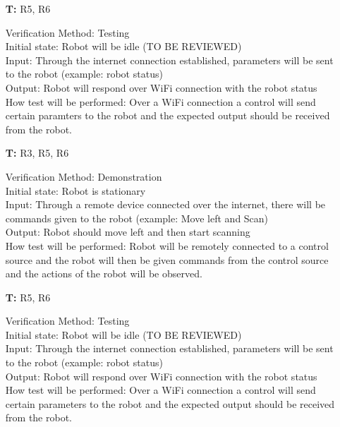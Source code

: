 \documentclass[12pt, titlepage]{article}
\newcounter{tnum} %
\begin{document}
\begin{itemize}
\item[\textbf{T\refstepcounter{tnum}\thetnum:}]{R5, R6\\}

Verification Method: Testing	\\
Initial state: Robot will be idle (TO BE REVIEWED) \\
Input: Through the internet connection established, parameters will be sent to the robot (example: robot status) \\
Output: Robot will respond over WiFi connection with the robot status  \\
How test will be performed: Over a WiFi connection a control will send certain paramters to the robot and the expected output should be received from the robot. \\

\item[\textbf{T\refstepcounter{tnum}\thetnum:}]{R3, R5, R6\\}

Verification Method: Demonstration\\
Initial state: Robot is stationary \\
Input: Through a remote device connected over the internet, there will be commands given to the robot (example: Move left and Scan) \\
Output: Robot should move left and then start scanning  \\
How test will be performed: Robot will be remotely connected to a control source and the robot will then be given commands from the control source and the actions of the robot will be observed. \\

\item[\textbf{T\refstepcounter{tnum}\thetnum:}]{R5, R6\\}

Verification Method: Testing\\
Initial state: Robot will be idle (TO BE REVIEWED) \\
Input: Through the internet connection established, parameters will be sent to the robot (example: robot status) \\
Output: Robot will respond over WiFi connection with the robot status  \\
How test will be performed: Over a WiFi connection a control will send certain parameters to the robot and the expected output should be received from the robot. \\


\end{itemize}
\end{document}
